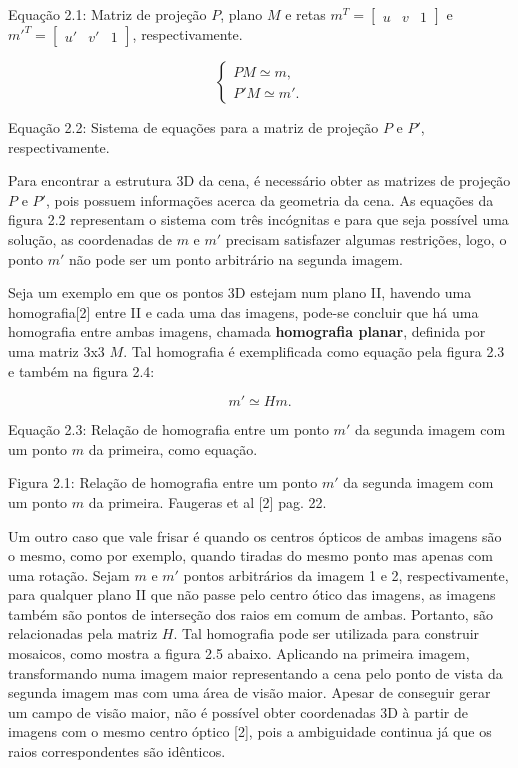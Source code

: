 Equação 2.1: Matriz de projeção $P$, plano $M$ e retas $m^T = \begin{bmatrix}u & v & 1\end{bmatrix}$ e $m'^T = \begin{bmatrix}u' & v' & 1\end{bmatrix}$, respectivamente.

$$
\begin{cases}
P M \simeq m, \\
P' M \simeq m'.
\end{cases}
$$

Equação 2.2: Sistema de equações para a matriz de projeção $P$ e $P'$, respectivamente.

Para encontrar a estrutura 3D da cena, é necessário obter as matrizes de projeção $P$ e $P'$, pois possuem informações acerca da geometria da cena. As equações da figura 2.2 representam o sistema com três incógnitas e para que seja possível uma solução, as coordenadas de $m$ e $m'$ precisam satisfazer algumas restrições, logo, o ponto $m'$ não pode ser um ponto arbitrário na segunda imagem.

Seja um exemplo em que os pontos 3D estejam num plano II, havendo uma homografia[2] entre II e cada uma das imagens, pode-se concluir que há uma homografia entre ambas imagens, chamada \textbf{homografia planar}, definida por uma matriz 3x3 $M$. Tal homografia é exemplificada como equação pela figura 2.3 e também na figura 2.4:

$$
m' \simeq Hm.
$$

Equação 2.3: Relação de homografia entre um ponto $m'$ da segunda imagem com um ponto $m$ da primeira, como equação.

Figura 2.1: Relação de homografia entre um ponto $m'$ da segunda imagem com um ponto $m$ da primeira. Faugeras et al [2] pag. 22.

Um outro caso que vale frisar é quando os centros ópticos de ambas imagens são o mesmo, como por exemplo, quando tiradas do mesmo ponto mas apenas com uma rotação. Sejam $m$ e $m'$ pontos arbitrários da imagem 1 e 2, respectivamente, para qualquer plano II que não passe pelo centro ótico das imagens, as imagens também são pontos de interseção dos raios em comum de ambas. Portanto, são relacionadas pela matriz $H$. Tal homografia pode ser utilizada para construir mosaicos, como mostra a figura 2.5 abaixo. Aplicando na primeira imagem, transformando numa imagem maior representando a cena pelo ponto de vista da segunda imagem mas com uma área de visão maior. Apesar de conseguir gerar um campo de visão maior, não é possível obter coordenadas 3D à partir de imagens com o mesmo centro óptico [2], pois a ambiguidade continua já que os raios correspondentes são idênticos.

